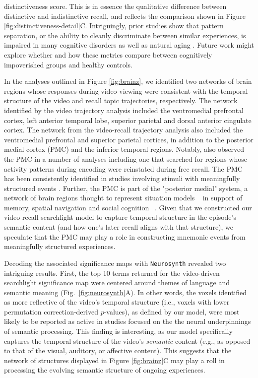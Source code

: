 \documentclass{article}
\begin{document}
distinctiveness score.  This is in essence the qualitative difference between distinctive and indistinctive recall, and reflects the comparison shown in Figure \ref{fig:distinctiveness-detail}C.  Intriguingly, prior studies show that pattern separation, or the ability to cleanly discriminate between similar experiences, is impaired in many cognitive disorders as well as natural aging \citep{StarEtal10, YassEtal11c, YassStar11b}.  Future work might explore whether and how these metrics compare between cognitively impoverished groups and healthy controls.

In the analyses outlined in Figure \ref{fig:brainz}, we identified two networks of brain regions whose responses during video viewing were consistent with the temporal structure of the video and recall topic trajectories, respectively. The network identified by the video trajectory analysis included the ventromedial prefrontal cortex, left anterior temporal lobe, superior parietal and dorsal anterior cingulate cortex. The network from the video-recall trajectory analysis also included the ventromedial prefrontal and superior parietal cortices, in addition to the posterior medial cortex (PMC) and the inferior temporal regions. Notably, \cite{ChenEtal17} also observed the PMC in a number of analyses including one that searched for regions whose activity patterns during encoding were reinstated during free recall. The PMC has been consistently identified in studies involving stimuli with meaningfully structured events \cite{CohnRang17}. Further, the PMC is part of the "posterior medial" system, a network of brain regions thought to represent situation models ~\cite{ZackEtal07} in support of memory, spatial navigation and social cognition ~\citep{RangRitc12}. Given that we constructed our video-recall searchlight model to capture temporal structure in the episode's semantic content (and how one's later recall aligns with that structure), we speculate that the PMC may play a role in constructing mnemonic events from meaningfully structured experiences.


Decoding the associated significance maps with \texttt{Neurosynth} revealed two intriguing results.  First, the top 10 terms returned for the video-driven searchlight significance map were centered around themes of language and semantic meaning (Fig.~\ref{fig:neurosynth}A).  In other words, the voxels identified as more reflective of the video's temporal structure (i.e., voxels with lower permutation correction-derived $p$-values), as defined by our model, were most likely to be reported as active in studies focused on the the neural underpinnings of semantic processing.  This finding is interesting, as our model specifically captures the temporal structure of the video's \textit{semantic} content (e.g., as opposed to that of the visual, auditory, or affective content).  This suggests that the network of structures displayed in Figure \ref{fig:brainz}C may play a roll in processing the evolving semantic structure of ongoing experiences.
\end{document}

